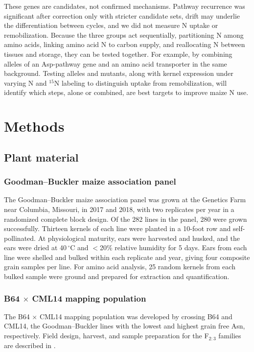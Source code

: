 These genes are candidates, not confirmed mechanisms. Pathway recurrence was significant after correction only with stricter candidate sets, drift may underlie the differentiation between cycles, and we did not measure N uptake or remobilization. Because the three groups act sequentially, partitioning N among amino acids, linking amino acid N to carbon supply, and reallocating N between tissues and storage, they can be tested together. For example, by combining alleles of an Asp-pathway gene and an amino acid transporter in the same background. Testing alleles and mutants, along with kernel expression under varying N and $^{15}$N labeling to distinguish uptake from remobilization, will identify which steps, alone or combined, are best targets to improve maize N use.

\section{Methods}

\subsection{Plant material}

\subsubsection{Goodman--Buckler maize association panel}
The Goodman--Buckler maize association panel \citep{FlintGarcia2005Goodman} was grown at the Genetics Farm near Columbia, Missouri, in 2017 and 2018, with two replicates per year in a randomized complete block design. Of the 282 lines in the panel, 280 were grown successfully. Thirteen kernels of each line were planted in a 10-foot row and self-pollinated. At physiological maturity, ears were harvested and husked, and the ears were dried at 40\,$^{\circ}$C and $<$20\% relative humidity for 5 days. Ears from each line were shelled and bulked within each replicate and year, giving four composite grain samples per line. For amino acid analysis, 25 random kernels from each bulked sample were ground and prepared for extraction and quantification.

\subsubsection{B64 $\times$ CML14 mapping population}
The B64 $\times$ CML14 mapping population was developed by crossing B64 and CML14, the Goodman--Buckler lines with the lowest and highest grain free Asn, respectively. Field design, harvest, and sample preparation for the F$_{2:3}$ families are described in \citet{Fitzsimmons2026KernelKitchen}.

